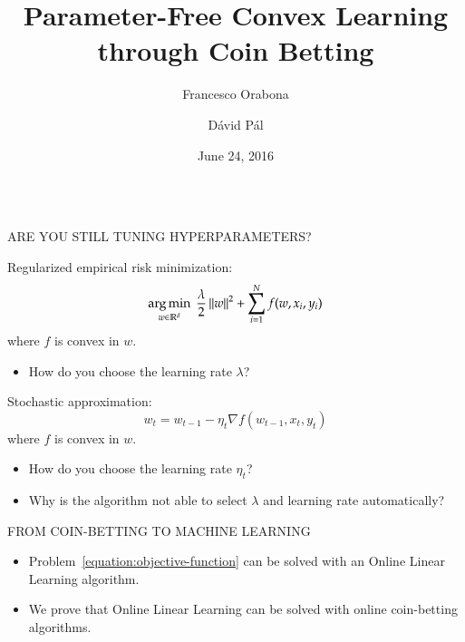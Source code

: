 \documentclass[final,t,serif,mathserif]{beamer}
\title{\huge Parameter-Free Convex Learning through Coin Betting}
\author{Francesco Orabona \and D\'avid P\'al}
\institute[] %
{
  Yahoo Research, New York
}
\date[June 24, 2016]{June 24, 2016}
\newcommand{\grad}{\nabla}
\def\blockspacea{\vspace{0.cm}}
\begin{document}
\begin{frame}{}

\begin{columns}[t]

\begin{column}{.33\linewidth}

    \begin{block}{ARE YOU STILL TUNING HYPERPARAMETERS?}
      \blockspacea
      
      Regularized empirical risk minimization:
      \begin{equation}
      \label{equation:objective-function}
         \operatorname*{arg\,min}_{w \in \mathbb{R}^d} \ \frac{\lambda}{2} \left\|{w}\right\|^2 + \sum_{i=1}^N f(w, x_i, y_i)
      \end{equation}
      where $f$ is convex in $w$.
      \begin{itemize}
      \item How do you choose the learning rate $\lambda$?
      \end{itemize}
      
      \vspace{1cm}
      
      Stochastic approximation:
      \begin{equation}
      \label{equation:objective-function-sa}
         w_t = w_{t-1} - \eta_t \grad f(w_{t-1}, x_t, y_t)
      \end{equation}
      where $f$ is convex in $w$.
      \begin{itemize}
      \item How do you choose the learning rate $\eta_t$?
      \end{itemize}
      
      \vspace{1cm}
      
      \begin{itemize}      
      \item \alert{Why is the algorithm not able to select $\lambda$ and learning rate automatically?}
      \end{itemize}
      
      \blockspacea
    \end{block}

    \begin{block}{FROM COIN-BETTING TO MACHINE LEARNING}
    \blockspacea
    
    \begin{itemize}
      \item Problem~\eqref{equation:objective-function} can be solved with an Online Linear Learning algorithm.
      \item We prove that Online Linear Learning can be solved with online coin-betting algorithms.
    \end{itemize}


\end{block}
\end{column}
\end{columns}
\end{frame}
\end{document}
